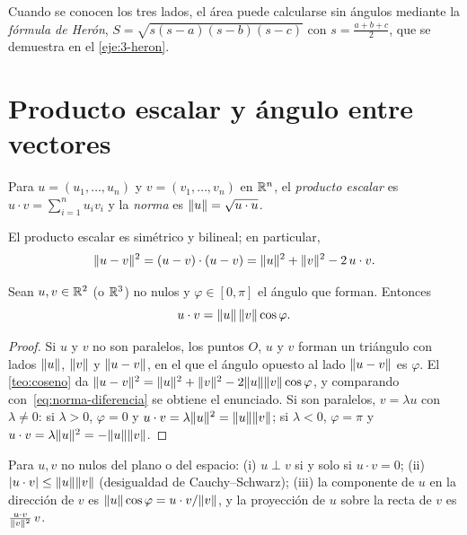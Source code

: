 Cuando se conocen los tres lados, el área puede calcularse sin ángulos mediante la \emph{fórmula de Herón}, $S=\sqrt{s(s-a)(s-b)(s-c)}$ con $s=\frac{a+b+c}{2}$, que se demuestra en el \cref{eje:3-heron}.

\section{Producto escalar y ángulo entre vectores}

\begin{definicion}
Para $u=(u_1,\dots,u_n)$ y $v=(v_1,\dots,v_n)$ en $\mathbb{R}^{n}$, el \emph{producto escalar} es $u\cdot v=\sum_{i=1}^{n}u_iv_i$ y la \emph{norma} es $\lVert u\rVert=\sqrt{u\cdot u}$.
\end{definicion}

El producto escalar es simétrico y bilineal; en particular,
\begin{equation}\label{eq:norma-diferencia}
\lVert u-v\rVert^{2}=(u-v)\cdot(u-v)=\lVert u\rVert^{2}+\lVert v\rVert^{2}-2\,u\cdot v .
\end{equation}

\begin{teorema}\label{teo:escalar}
Sean $u,v\in\mathbb{R}^{2}$ (o $\mathbb{R}^{3}$) no nulos y $\varphi\in[0,\pi]$ el ángulo que forman. Entonces
\[
u\cdot v=\lVert u\rVert\,\lVert v\rVert\cos\varphi .
\]
\end{teorema}

\begin{proof}
Si $u$ y $v$ no son paralelos, los puntos $O$, $u$ y $v$ forman un triángulo con lados $\lVert u\rVert$, $\lVert v\rVert$ y $\lVert u-v\rVert$, en el que el ángulo opuesto al lado $\lVert u-v\rVert$ es $\varphi$. El \cref{teo:coseno} da $\lVert u-v\rVert^{2}=\lVert u\rVert^{2}+\lVert v\rVert^{2}-2\lVert u\rVert\lVert v\rVert\cos\varphi$, y comparando con~\eqref{eq:norma-diferencia} se obtiene el enunciado. Si son paralelos, $v=\lambda u$ con $\lambda\ne0$: si $\lambda>0$, $\varphi=0$ y $u\cdot v=\lambda\lVert u\rVert^{2}=\lVert u\rVert\lVert v\rVert$; si $\lambda<0$, $\varphi=\pi$ y $u\cdot v=\lambda\lVert u\rVert^{2}=-\lVert u\rVert\lVert v\rVert$.
\end{proof}

\begin{corolario}\label{cor:escalar}
Para $u,v$ no nulos del plano o del espacio: (i) $u\perp v$ si y solo si $u\cdot v=0$; (ii) $\lvert u\cdot v\rvert\le\lVert u\rVert\lVert v\rVert$ (desigualdad de Cauchy--Schwarz); (iii) la componente de $u$ en la dirección de $v$ es $\lVert u\rVert\cos\varphi=u\cdot v/\lVert v\rVert$, y la proyección de $u$ sobre la recta de $v$ es $\frac{u\cdot v}{\lVert v\rVert^{2}}\,v$.
\end{corolario}

